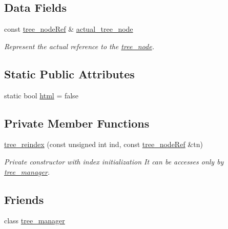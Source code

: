 \subsection*{Data Fields}
\begin{DoxyCompactItemize}
\item 
const \hyperlink{tree__node_8hpp_a6ee377554d1c4871ad66a337eaa67fd5}{tree\+\_\+node\+Ref} \& \hyperlink{classtree__reindex_acee28e4416c0893072fbf88c3c4304a4}{actual\+\_\+tree\+\_\+node}
\begin{DoxyCompactList}\small\item\em Represent the actual reference to the \hyperlink{classtree__node}{tree\+\_\+node}. \end{DoxyCompactList}\end{DoxyCompactItemize}
\subsection*{Static Public Attributes}
\begin{DoxyCompactItemize}
\item 
static bool \hyperlink{classtree__reindex_a0bda6b15f45a9f79195d0183cdc352de}{html} = false
\end{DoxyCompactItemize}
\subsection*{Private Member Functions}
\begin{DoxyCompactItemize}
\item 
\hyperlink{classtree__reindex_abdb9b71762bed3ddce4d63a800be428f}{tree\+\_\+reindex} (const unsigned int ind, const \hyperlink{tree__node_8hpp_a6ee377554d1c4871ad66a337eaa67fd5}{tree\+\_\+node\+Ref} \&tn)
\begin{DoxyCompactList}\small\item\em Private constructor with index initialization It can be accesses only by \hyperlink{classtree__manager}{tree\+\_\+manager}. \end{DoxyCompactList}\end{DoxyCompactItemize}
\subsection*{Friends}
\begin{DoxyCompactItemize}
\item 
class \hyperlink{classtree__reindex_a254e84412a115167e85294af86ad8de7}{tree\+\_\+manager}
\end{DoxyCompactItemize}


